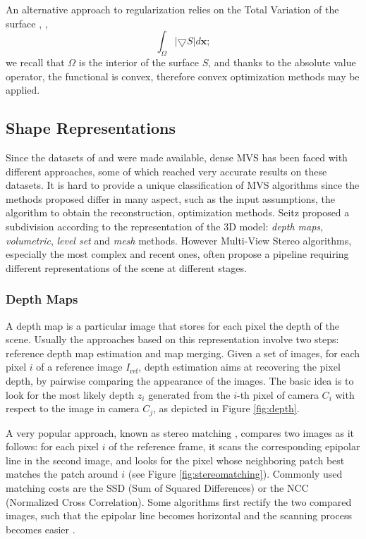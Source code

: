 
An alternative approach to regularization relies on the Total Variation of the surface \cite{chambolle2010introduction}, \ie, 
\[
\int_{\mathit{\Omega}}|\bigtriangledown \mathit{S}|d\mathbf{x};
\]
we recall that  $\mathit{\Omega}$ is the interior of the surface $\mathit{S}$, and thanks to the absolute value operator, the functional is convex, therefore convex optimization methods may be applied.



\subsection{Shape Representations}
Since the datasets of \cite{seitz_et_al06} and \cite{strecha2008} were made available, dense MVS has been faced with different approaches, some of which reached very accurate results on these datasets.
It is hard to provide a unique classification of MVS algorithms since the methods proposed differ in many aspect, such as the input assumptions, the algorithm to obtain the reconstruction, optimization methods. 
Seitz \etal \cite{seitz_et_al06} proposed a subdivision according to the representation of the 3D model: \emph{depth maps}, \emph{volumetric},  \emph{level set} and \emph{mesh} methods. 
However Multi-View Stereo algorithms, especially the most complex and recent ones, often propose a pipeline requiring different representations of the scene at different stages.

\subsubsection{Depth Maps}
A depth map is a particular image that stores for each pixel the depth of the scene.
Usually the approaches based on this representation involve two steps: reference depth map estimation and map merging.
Given a set of images, for each pixel $i$ of a reference image $I_{\text{ref}}$, depth estimation aims at recovering the pixel depth, by pairwise comparing the appearance of the images. 
The basic idea is to look for the most likely depth $z_i$ generated from the $i$-th pixel of camera $C_i$ with respect to the image in camera $C_j$, as depicted in Figure \ref{fig:depth}.

A very popular approach, known as stereo matching \cite{scharstein2002taxonomy,lhuillier2002match}, compares two images as it follows: for each pixel $i$ of the reference frame, it scans the corresponding epipolar line in the second image, and looks for the pixel whose neighboring patch best matches the patch around $i$ (see Figure \ref{fig:stereomatching}). 
Commonly used matching costs are the SSD (Sum of Squared Differences) or the NCC (Normalized Cross Correlation).
Some algorithms first rectify the two compared images, such that the epipolar line becomes horizontal and the scanning process becomes easier 
\cite{kang2001handling,bradley2008accurate,moons20093d}. 



